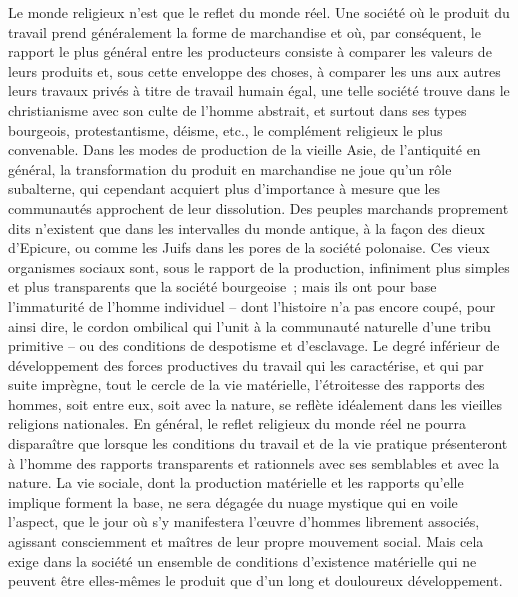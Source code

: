 \documentclass[french,twoside]{book} %
\begin{document}
Le monde religieux n’est que le reflet du monde réel. Une société où le produit du travail prend généralement la forme de marchandise et où, par conséquent, le rapport le plus général entre les producteurs consiste à comparer les valeurs de leurs produits et, sous cette enveloppe des choses, à comparer les uns aux autres leurs travaux privés à titre de travail humain égal, une telle société trouve dans le christianisme avec son culte de l’homme abstrait, et surtout dans ses types bourgeois, protestantisme, déisme, etc., le complément religieux le plus convenable. Dans les modes de production de la vieille Asie, de l’antiquité en général, la transformation du produit en marchandise ne joue qu’un rôle subalterne, qui cependant acquiert plus d’importance à mesure que les communautés approchent de leur dissolution. Des peuples marchands proprement dits n’existent que dans les intervalles du monde antique, à la façon des dieux d’Epicure, ou comme les Juifs dans les pores de la société polonaise. Ces vieux organismes sociaux sont, sous le rapport de la production, infiniment plus simples et plus transparents que la société bourgeoise ; mais ils ont pour base l’immaturité de l’homme individuel – dont l’histoire n’a pas encore coupé, pour ainsi dire, le cordon ombilical qui l’unit à la communauté naturelle d’une tribu primitive – ou des conditions de despotisme et d’esclavage. Le degré inférieur de développement des forces productives du travail qui les caractérise, et qui par suite imprègne, tout le cercle de la vie matérielle, l’étroitesse des rapports des hommes, soit entre eux, soit avec la nature, se reflète idéalement dans les vieilles religions nationales. En général, le reflet religieux du monde réel ne pourra disparaître que lorsque les conditions du travail et de la vie pratique présenteront à l’homme des rapports transparents et rationnels avec ses semblables et avec la nature. La vie sociale, dont la production matérielle et les rapports qu’elle implique forment la base, ne sera dégagée du nuage mystique qui en voile l’aspect, que le jour où s’y manifestera l’œuvre d’hommes librement associés, agissant consciemment et maîtres de leur propre mouvement social. Mais cela exige dans la société un ensemble de conditions d’existence matérielle qui ne peuvent être elles-mêmes le produit que d’un long et douloureux développement.\par
\end{document}
